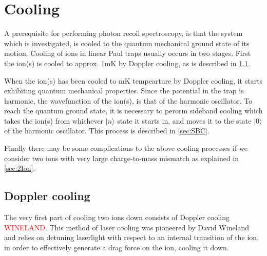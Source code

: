 \chapter{Cooling}
\label{chap:Cooling}
A prerequisite for performing photon recoil spectroscopy, is that the system which is investigated, is cooled to the quantum mechanical ground state of its motion.
Cooling of ions in linear Paul traps usually occurs in two stages. First the ion(s) is cooled to approx. 1mK by Doppler cooling, as is described in \cref{sec:Doppler}.

When the ion(s) has been cooled to mK tempearture by Doppler cooling, it starts exhibiting quantum mechanical properties. Since the potential in the trap is harmonic, the wavefunction of the ion(s), is that of the harmonic oscillator.
To reach the quantum ground state, it is necessary to perorm sideband cooling which takes the ion(s) from whichever $\vert n\rangle$ state it starts in, and moves it to the state $\vert0\rangle$ of the harmonic oscillator. This process is described in \cref{sec:SBC}.

Finally there may be some complications to the above cooling processes if we consider two ions with very large charge-to-mass mismatch as explained in \cref{sec:2Ion}. 
\section{Doppler cooling}
\label{sec:Doppler}
The very first part of cooling two ions down consists of Doppler cooling \textcolor{red}{WINELAND}. This method of laser cooling was pioneered by David Wineland and relies on detuning laserlight with respect to an internal transition of the ion, in order to effectively generate a drag force on the ion, cooling it down.


